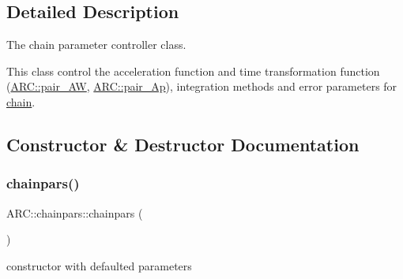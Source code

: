 \subsection{Detailed Description}
The chain parameter controller class. 

This class control the acceleration function and time transformation function (\hyperlink{namespaceARC_a5c4308ca4a8d0e0ff59fdce30f00274c}{A\+R\+C\+::pair\+\_\+\+AW}, \hyperlink{namespaceARC_aed8f19a0c6ae7dc0bb3696b337d7b9f6}{A\+R\+C\+::pair\+\_\+\+Ap}), integration methods and error parameters for \hyperlink{classARC_1_1chain}{chain}. 

\subsection{Constructor \& Destructor Documentation}
\hypertarget{classARC_1_1chainpars_a2019a609d85e2b801f306ac8c7f268ab}{}\label{classARC_1_1chainpars_a2019a609d85e2b801f306ac8c7f268ab} 
\subsubsection{\texorpdfstring{chainpars()}{chainpars()}\hspace{0.1cm}{\footnotesize\ttfamily [1/2]}}
{\footnotesize\ttfamily A\+R\+C\+::chainpars\+::chainpars (\begin{DoxyParamCaption}{ }\end{DoxyParamCaption})\hspace{0.3cm}{\ttfamily [inline]}}



constructor with defaulted parameters 



